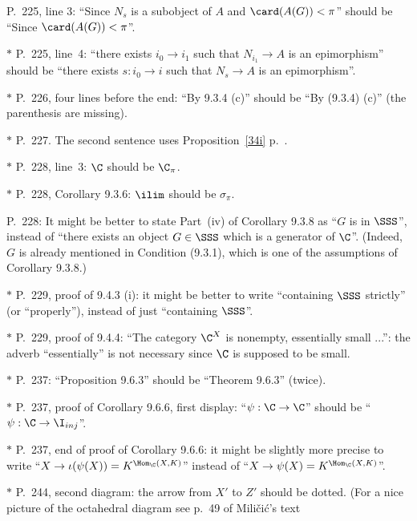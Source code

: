 \documentclass[12pt]{article}
\theoremstyle{remark}
\theoremstyle{definition}
\begin{document}
\begin{s}
P.~225, line 3: ``Since $N_s$ is a subobject of $A$ and $\card(A(G))<\pi$'' should be ``Since $\card(A(G))<\pi$''.

\nn$*$ P.~225, line~4: ``there exists $i_0\to i_1$ such that $N_{i_1}\to A$ is an epimorphism'' should be ``there exists $s:i_0\to i$ such that $N_s\to A$ is an epimorphism''.
\end{s}

\nn$*$ P.~226, four lines before the end: ``By 9.3.4 (c)'' should be ``By (9.3.4) (c)'' (the parenthesis are missing).

\nn$*$ P.~227. The second sentence uses Proposition~\ref{34i} p.~.

\nn$*$ P.~228, line~3: $\C$ should be $\C_\pi$.

\nn$*$ P.~228, Corollary 9.3.6: $\ilim$ should be $\sigma_\pi$.

\begin{s}
P.~228: It might be better to state Part~(iv) of Corollary 9.3.8 as ``$G$ is in $\SSS$'', instead of ``there exists an object $G\in\SSS$ which is a generator of $\C$''. (Indeed, $G$ is already mentioned in Condition (9.3.1), which is one of the assumptions of Corollary 9.3.8.)
\end{s}

\nn$*$ P.~229, proof of 9.4.3 (i): it might be better to write ``containing $\SSS$ strictly'' (or ``properly''), instead of just ``containing $\SSS$''. 

\nn$*$ P.~229, proof of 9.4.4: ``The category $\C^X$ is nonempty, essentially small ...'': the adverb ``essentially'' is not necessary since $\C$ is supposed to be small. 


\nn$*$ P.~237: ``Proposition 9.6.3'' should be ``Theorem 9.6.3'' (twice). 

\nn$*$ P.~237, proof of Corollary 9.6.6, first display: ``$\psi:\C\to\C$'' should be ``$\psi:\C\to\I_{inj}$''. 

\nn$*$ P.~237, end of proof of Corollary 9.6.6: it might be slightly more precise to write ``$X\to\iota(\psi(X))=K^{\Hom_\C(X,K)}$'' instead of ``$X\to\psi(X)=K^{\Hom_\C(X,K)}$''.

\nn$*$ P.~244, second diagram: the arrow from $X'$ to $Z'$ should be dotted. (For a nice picture of the octahedral diagram see p.~49 of Mili\v{c}i\'c's text
\end{document}

